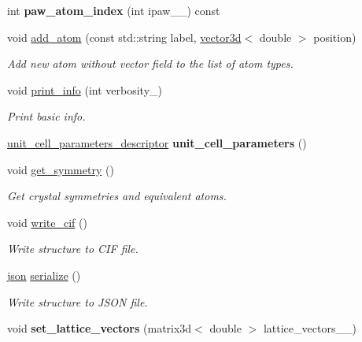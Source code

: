 \begin{DoxyCompactItemize}
\item 
\hypertarget{classsirius_1_1_unit__cell_aa495aac96812c19266e0787c219f66ee}{}int {\bfseries paw\+\_\+atom\+\_\+index} (int ipaw\+\_\+\+\_\+) const \label{classsirius_1_1_unit__cell_aa495aac96812c19266e0787c219f66ee}

\item 
void \hyperlink{classsirius_1_1_unit__cell_a89843c24de69f8968140a9cfff4bdd0f}{add\+\_\+atom} (const std\+::string label, \hyperlink{classgeometry3d_1_1vector3d}{vector3d}$<$ double $>$ position)
\begin{DoxyCompactList}\small\item\em Add new atom without vector field to the list of atom types. \end{DoxyCompactList}\item 
void \hyperlink{classsirius_1_1_unit__cell_aaa8632b9f2d62183100a46e7dd0790ba}{print\+\_\+info} (int verbosity\+\_\+)
\begin{DoxyCompactList}\small\item\em Print basic info. \end{DoxyCompactList}\item 
\hypertarget{classsirius_1_1_unit__cell_a0ea2da7e903ad8b8e8fb4fe7be33ac57}{}\hyperlink{structunit__cell__parameters__descriptor}{unit\+\_\+cell\+\_\+parameters\+\_\+descriptor} {\bfseries unit\+\_\+cell\+\_\+parameters} ()\label{classsirius_1_1_unit__cell_a0ea2da7e903ad8b8e8fb4fe7be33ac57}

\item 
void \hyperlink{classsirius_1_1_unit__cell_ac25877583212c7e6aac3c4f97d62fa9d}{get\+\_\+symmetry} ()
\begin{DoxyCompactList}\small\item\em Get crystal symmetries and equivalent atoms. \end{DoxyCompactList}\item 
void \hyperlink{classsirius_1_1_unit__cell_a948f43cc5840cb1021494c45628043d4}{write\+\_\+cif} ()
\begin{DoxyCompactList}\small\item\em Write structure to C\+I\+F file. \end{DoxyCompactList}\item 
\hyperlink{classnlohmann_1_1basic__json}{json} \hyperlink{classsirius_1_1_unit__cell_af1e86a5c3ac96c6ad7733939dad2eb40}{serialize} ()
\begin{DoxyCompactList}\small\item\em Write structure to J\+S\+O\+N file. \end{DoxyCompactList}\item 
\hypertarget{classsirius_1_1_unit__cell_acd012acfb8e7777227e7d54e1d542e7e}{}void {\bfseries set\+\_\+lattice\+\_\+vectors} (matrix3d$<$ double $>$ lattice\+\_\+vectors\+\_\+\+\_\+)\label{classsirius_1_1_unit__cell_acd012acfb8e7777227e7d54e1d542e7e}


\end{DoxyCompactItemize}
